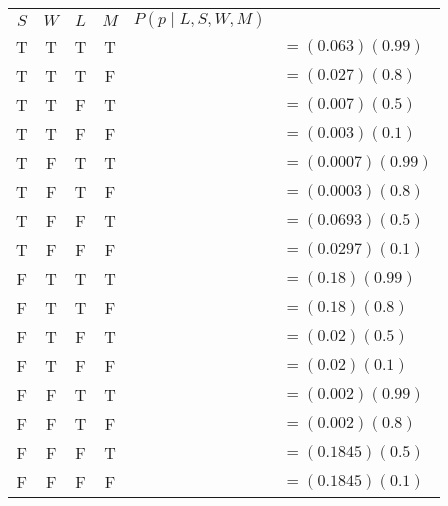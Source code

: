 \documentclass[fleqn]{hw7}
\begin{document}
\begin{enumerate}
\begin{tabular}{cccc|ll}
	$S$ & $W$ & $L$ & $M$ & $P(p \mid L,S,W,M)$ & \\ 
	\cline{1-5}
	T   & T & T & T &  & $ =(0.063)(0.99) $\\
	T   & T & T & F &  & $ =(0.027)(0.8) $\\
	T   & T & F & T &  & $ =(0.007)(0.5) $\\
	T   & T & F & F &  & $ =(0.003)(0.1) $\\
	T   & F & T & T &  & $ =(0.0007)(0.99) $\\
	T   & F & T & F &  & $ =(0.0003)(0.8) $\\
	T   & F & F & T &  & $ =(0.0693)(0.5) $\\	
	T   & F & F & F &  & $ =(0.0297)(0.1) $\\
	F   & T & T & T &  & $ =(0.18)(0.99) $\\
	F   & T & T & F &  & $ =(0.18)(0.8) $\\
	F   & T & F & T &  & $ =(0.02)(0.5) $\\	
	F   & T & F & F &  & $ =(0.02)(0.1) $\\	
	F   & F & T & T &  & $ =(0.002)(0.99) $\\
	F   & F & T & F &  & $ =(0.002)(0.8) $\\
	F   & F & F & T &  & $ =(0.1845)(0.5) $\\	
	F   & F & F & F &  & $ =(0.1845)(0.1) $	
\end{tabular}

\end{enumerate}
\end{document}
